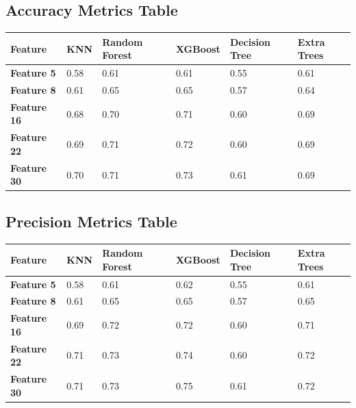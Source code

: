 \documentclass[letterpaper]{article}
\begin{document}
\bigskip


\bigskip

\subsection{Accuracy Metrics Table}
\begin{flushleft}
\tablefirsthead{}
\tablehead{}
\tabletail{}
\tablelasttail{}
\begin{supertabular}{|m{0.7677598in}|m{0.41085985in}|m{1.0830599in}|m{0.66565984in}|m{0.9497598in}|m{0.8309598in}|}
\hline
{\bfseries Feature} &
{\bfseries KNN} &
{\bfseries Random Forest} &
{\bfseries XGBoost} &
{\bfseries Decision Tree} &
{\bfseries Extra Trees}\\\hline
{\bfseries Feature 5} &
0.58 &
0.61 &
0.61 &
0.55 &
0.61\\\hline
{\bfseries Feature 8} &
0.61 &
0.65 &
0.65 &
0.57 &
0.64\\\hline
{\bfseries Feature 16} &
0.68 &
0.70 &
0.71 &
0.60 &
0.69\\\hline
{\bfseries Feature 22} &
0.69 &
0.71 &
0.72 &
0.60 &
0.69\\\hline
{\bfseries Feature 30} &
0.70 &
0.71 &
0.73 &
0.61 &
0.69\\\hline
\end{supertabular}
\end{flushleft}

\bigskip

\subsection{Precision Metrics Table}
\begin{flushleft}
\tablefirsthead{}
\tablehead{}
\tabletail{}
\tablelasttail{}
\begin{supertabular}{|m{0.7677598in}|m{0.41085985in}|m{1.0830599in}|m{0.66565984in}|m{0.9497598in}|m{0.8309598in}|}
\hline
{\bfseries Feature} &
{\bfseries KNN} &
{\bfseries Random Forest} &
{\bfseries XGBoost} &
{\bfseries Decision Tree} &
{\bfseries Extra Trees}\\\hline
{\bfseries Feature 5} &
0.58 &
0.61 &
0.62 &
0.55 &
0.61\\\hline
{\bfseries Feature 8} &
0.61 &
0.65 &
0.65 &
0.57 &
0.65\\\hline
{\bfseries Feature 16} &
0.69 &
0.72 &
0.72 &
0.60 &
0.71\\\hline
{\bfseries Feature 22} &
0.71 &
0.73 &
0.74 &
0.60 &
0.72\\\hline
{\bfseries Feature 30} &
0.71 &
0.73 &
0.75 &
0.61 &
0.72\\\hline
\end{supertabular}
\end{flushleft}
\end{document}
